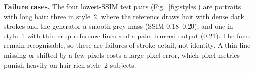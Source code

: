 \textbf{Failure cases.} The four lowest-SSIM test pairs (Fig.~\ref{fig:styles}) are portraits with long hair: three in style~2, where the reference draws hair with dense dark strokes and the generator a smooth grey mass (SSIM 0.18--0.20), and one in style~1 with thin crisp reference lines and a pale, blurred output (0.21). The faces remain recognisable, so these are failures of stroke detail, not identity. A thin line missing or shifted by a few pixels costs a large pixel error, which pixel metrics punish heavily on hair-rich style~2 subjects.
